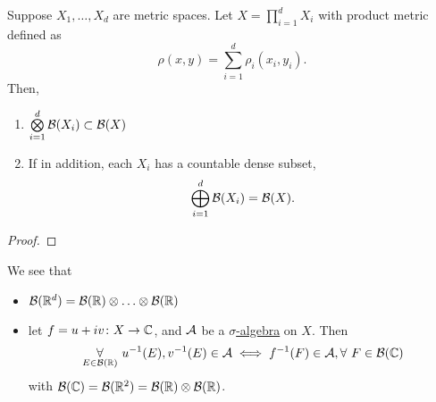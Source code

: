 \begin{theorem}
  Suppose \(X_1, \ldots , X_d \) are metric spaces. Let \(X = \prod\limits_{i=1}^{d} X_{i}\) with product metric defined as
  \[
    \rho (x, y) = \sum\limits_{i=1}^{d} \rho _{i}(x_{i}, y_{i}).
  \]
  Then,
  \begin{enumerate}
    \item \(\bigotimes\limits_{i=1}^{d}\mathcal{\MakeUppercase{b}} (X_{i})\subset \mathcal{\MakeUppercase{b}} (X)\)
    \item If in addition, each \(X_{i}\) has a countable dense subset,
          \[
            \bigoplus\limits_{i=1}^{d}\mathcal{\MakeUppercase{b}} (X_{i}) = \mathcal{\MakeUppercase{b}} (X).
          \]
  \end{enumerate}
\end{theorem}
\begin{proof}
\end{proof}

\begin{remark}
  We see that
  \begin{itemize}
    \item \(\mathcal{\MakeUppercase{b}} (\mathbb{\MakeUppercase{r}} ^d) = \mathcal{\MakeUppercase{b}} (\mathbb{\MakeUppercase{r}} )\otimes \ldots \otimes \mathcal{\MakeUppercase{b}} (\mathbb{\MakeUppercase{r}} ) \)
    \item let \(f = u + iv\colon X\to \mathbb{\MakeUppercase{c}} \), and \(\mathcal{\MakeUppercase{a}} \) be a \hyperref[def:sigma-algebra]{\(\sigma\)-algebra} on \(X\). Then
          \[
            \underset{E\in \mathcal{\MakeUppercase{b}} (\mathbb{\MakeUppercase{r}} )}{\forall }\ u^{-1} (E), v^{-1} (E)\in \mathcal{\MakeUppercase{a}}
            \iff
            f^{-1} (F)\in \mathcal{\MakeUppercase{a}}, \forall\ F\in \mathcal{\MakeUppercase{b}} (\mathbb{\MakeUppercase{c}} )
          \]
          with \(\mathcal{\MakeUppercase{b}} (\mathbb{\MakeUppercase{c}} ) = \mathcal{\MakeUppercase{b}} (\mathbb{\MakeUppercase{r}} ^2) = \mathcal{\MakeUppercase{b}} (\mathbb{\MakeUppercase{r}} )\otimes \mathcal{\MakeUppercase{b}} (\mathbb{\MakeUppercase{r}} )\).
  \end{itemize}
\end{remark}

